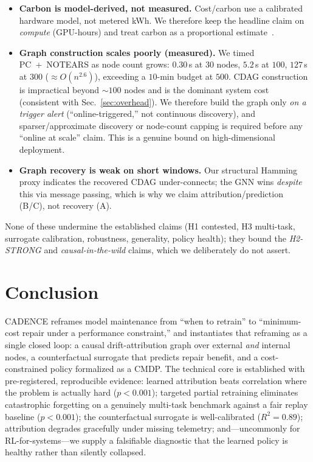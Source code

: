 \documentclass[conference]{IEEEtran}
\begin{document}
\begin{itemize}
\item \textbf{Carbon is model-derived, not measured.} Cost/carbon use a
calibrated hardware model, not metered kWh. We therefore keep the headline
claim on \emph{compute} (GPU-hours) and treat carbon as a proportional
estimate~\cite{lacoste2019quantifying,patterson2021carbon}.
\item \textbf{Graph construction scales poorly (measured).} We timed
PC~+~NOTEARS as node count grows: $0.30$\,s at $30$ nodes, $5.2$\,s at
$100$, $127$\,s at $300$ ($\approx O(n^{2.6})$), exceeding a $10$-min budget
at $500$. CDAG construction is impractical beyond $\sim\!100$ nodes and is
the dominant system cost (consistent with Sec.~\ref{sec:overhead}). We
therefore build the graph only \emph{on a trigger alert}
(``online-triggered,'' not continuous discovery), and sparser/approximate
discovery or node-count capping is required before any ``online at scale''
claim. This is a genuine bound on high-dimensional deployment.
\item \textbf{Graph recovery is weak on short windows.} Our structural
Hamming proxy indicates the recovered CDAG under-connects; the GNN wins
\emph{despite} this via message passing, which is why we claim
attribution/prediction (B/C), not recovery (A).
\end{itemize}

None of these undermine the established claims (H1 contested, H3
multi-task, surrogate calibration, robustness, generality, policy health);
they bound the \emph{H2-STRONG} and \emph{causal-in-the-wild} claims,
which we deliberately do not assert.

\section{Conclusion}\label{sec:conclusion}
CADENCE reframes model maintenance from ``when to retrain'' to
``minimum-cost repair under a performance constraint,'' and instantiates
that reframing as a single closed loop: a causal drift-attribution graph
over external \emph{and} internal nodes, a counterfactual surrogate that
predicts repair benefit, and a cost-constrained policy formalized as a
CMDP. The technical core is established with pre-registered, reproducible
evidence: learned attribution beats correlation where the problem is
actually hard ($p<0.001$); targeted partial retraining eliminates
catastrophic forgetting on a genuinely multi-task benchmark against a fair
replay baseline ($p<0.001$); the counterfactual surrogate is
well-calibrated ($R^2=0.89$); attribution degrades gracefully under
missing telemetry; and---uncommonly for RL-for-systems---we supply a
falsifiable diagnostic that the learned policy is healthy rather than
silently collapsed.
\end{document}
